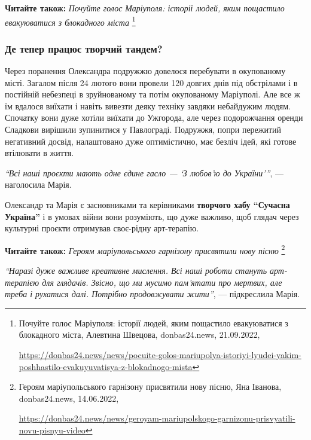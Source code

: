 \textbf{Читайте також:} \emph{Почуйте голос Маріуполя: історії людей, яким пощастило евакуюватися з блокадного міста}%
\footnote{Почуйте голос Маріуполя: історії людей, яким пощастило евакуюватися з блокадного міста, Алевтина Швецова, %
donbas24.news, 21.09.2022, \par%
\url{https://donbas24.news/news/pocuite-golos-mariupolya-istoriyi-lyudei-yakim-poshhastilo-evakuyuvatisya-z-blokadnogo-mista}%
}

\subsubsection{Де тепер працює творчий тандем?}


Через поранення Олександра подружжю довелося перебувати в окупованому місті.
Загалом після 24 лютого вони провели 120 довгих днів під обстрілами і в
постійній небезпеці в зруйнованому та потім окупованому Маріуполі. Але все ж їм
вдалося виїхати і навіть вивезти деяку техніку завдяки небайдужим людям.
Спочатку вони дуже хотіли виїхати до Ужгорода, але через подорожчання оренди
Сладкови вирішили зупинитися у Павлограді. Подружжя, попри пережитий негативний
досвід, налаштовано дуже оптимістично, має безліч ідей, які готове втілювати в
життя.

\begin{leftbar}
\emph{\enquote{Всі наші проєкти мають одне єдине гасло — \enquote{З любов'ю до України}}}, — наголосила Марія.
\end{leftbar}

Олександр та Марія є засновниками та керівниками \textbf{творчого хабу \enquote{Сучасна
Україна}} і в умовах війни вони розуміють, що дуже важливо, щоб глядач через
культурні проєкти отримував своє\hyp{}рідну арт-терапію.

\textbf{Читайте також:} \emph{Героям маріупольського гарнізону присвятили нову пісню}%
\footnote{Героям маріупольського гарнізону присвятили нову пісню, Яна Іванова, donbas24.news, 14.06.2022, \par%
\url{https://donbas24.news/news/geroyam-mariupolskogo-garnizonu-prisvyatili-novu-pisnyu-video}
}

\begin{leftbar}
\emph{\enquote{Наразі дуже важливе креативне мислення. Всі наші роботи стануть
арт-терапією для глядачів. Звісно, що ми мусимо пам'ятати про мертвих,
але треба і рухатися далі. Потрібно продовжувати жити}}, — підкреслила
Марія.
\end{leftbar}

